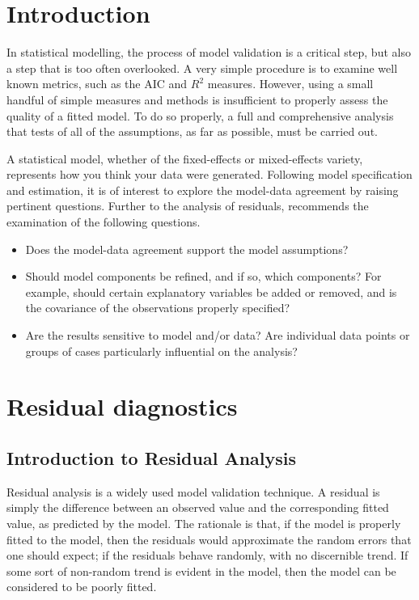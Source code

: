 \documentclass[Main.tex]{subfiles}
\begin{document}
\newpage
\section{Introduction}
In statistical modelling, the process of model validation is a critical step, but also a step that is too often overlooked. A very simple procedure is to examine well known
metrics, such as the AIC and $R^2$ measures. However, using a small handful of simple measures and methods is insufficient to properly assess the quality of a fitted model. To do so properly, a full and comprehensive
analysis that tests of all of the assumptions, as far as possible, must be carried out. 

A statistical model, whether of the fixed-effects or mixed-effects variety, represents how you think your data were generated. Following model specification and estimation, it is of interest to explore the model-data
agreement by raising pertinent questions. Further to the analysis of residuals, \citet{schab} recommends the examination of the following questions.
\begin{itemize}
	\item Does the model-data agreement support the model assumptions?
	\item Should model components be refined, and if so, which components? For example, should certain explanatory variables
	be added or removed, and is the covariance of the observations properly specified?
	\item Are the results sensitive to model and/or data? Are individual data points or groups of cases particularly
	influential on the analysis?
\end{itemize}
\newpage
\section{Residual diagnostics} %
\subsection{Introduction to Residual Analysis}
Residual analysis is a widely used model validation technique. A residual is simply the difference between an observed value and the corresponding fitted value, as predicted by the model. The rationale is that, if the model is properly fitted to the model, then the residuals would approximate the random errors that one should expect; if the residuals behave randomly, with no discernible trend. If some sort of non-random trend is evident in the model, then the model can be considered to be poorly fitted.
\end{document}

